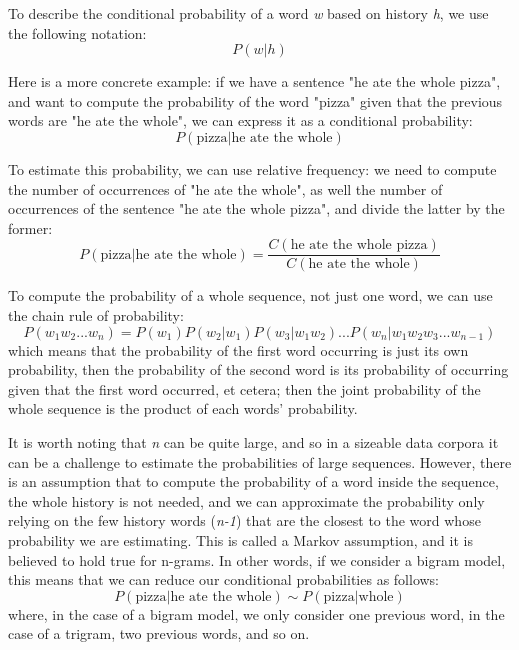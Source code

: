 \documentclass[sigplan,screen]{acmart}
\begin{document}
To describe the conditional probability of a word \textit{w} based on history \textit{h}, we use the following notation:
\begin{equation}
    P(w|h)
\end{equation}

Here is a more concrete example: if we have a sentence "he ate the whole pizza", and want to compute the probability of the word "pizza" given that the previous words are "he ate the whole", we can express it as a conditional probability:
\begin{equation}
    P(\text{pizza}|\text{he ate the whole})
\end{equation}

To estimate this probability, we can use relative frequency: we need to compute the number of occurrences of "he ate the whole", as well the number of occurrences of the sentence "he ate the whole pizza", and divide the latter by the former:
\begin{equation}
    P(\text{pizza}|\text{he ate the whole})=\frac{C(\text{he ate the whole pizza})}{C(\text{he ate the whole})}
\end{equation}

To compute the probability of a whole sequence, not just one word, we can use the chain rule of probability:
\begin{equation}
    P(w_1w_2...w_n) = P(w_1)P(w_2|w_1)P(w_3|w_1w_2)...P(w_n|w_1w_2w_3...w_{n-1})\label{eq:1}
\end{equation}
which means that the probability of the first word occurring is just its own probability, then the probability of the second word is its probability of occurring given that the first word occurred, et cetera; then the joint probability of the whole sequence is the product of each words' probability.

It is worth noting that \textit{n} can be quite large, and so in a sizeable data corpora it can be a challenge to estimate the probabilities of large sequences. However, there is an assumption that to compute the probability of a word inside the sequence, the whole history is not needed, and we can approximate the probability only relying on the few history words (\textit{n-1}) that are the closest to the word whose probability we are estimating. This is called a Markov assumption, and it is believed to hold true for n-grams. In other words, if we consider a bigram model, this means that we can reduce our conditional probabilities as follows:
\begin{equation}
    P(\text{pizza}|\text{he ate the whole}) \sim P(\text{pizza}|\text{whole})
\end{equation}
where, in the case of a bigram model, we only consider one previous word, in the case of a trigram, two previous words, and so on.
\end{document}
